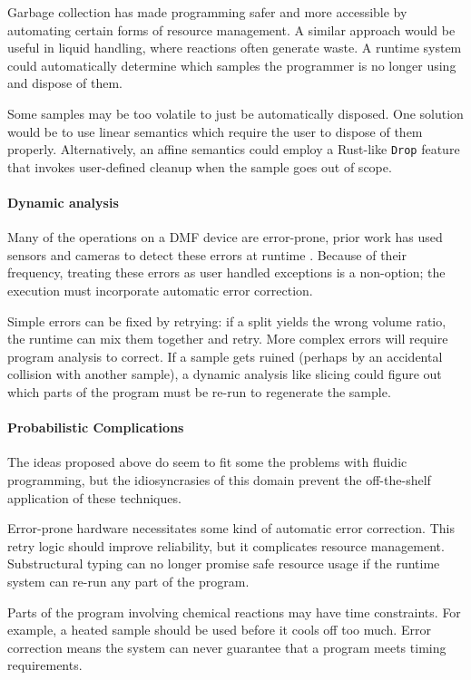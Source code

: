 \documentclass[
  10pt,
  a4paper,
  twocolumn,
]{article}
\begin{document}
Garbage collection has made programming safer and more accessible by automating certain forms of resource management.
A similar approach would be useful in liquid handling, where reactions often generate waste.
A runtime system could automatically determine which samples the programmer is no longer using and dispose of them.

Some samples may be too volatile to just be automatically disposed.
One solution would be to use linear semantics which require the user to dispose of them properly.
Alternatively, an affine semantics could employ a Rust-like {\tt Drop} feature that invokes user-defined cleanup when the sample goes out of scope.

\paragraph{Dynamic analysis}

Many of the operations on a DMF device are error-prone, prior work has used sensors and cameras
to detect these errors at runtime \cite{dmf-vision}. Because of their frequency, treating these errors as
user handled exceptions is a non-option; the execution must incorporate automatic error correction.

Simple errors can be fixed by retrying: if a split yields the wrong volume ratio, the runtime can mix them together and retry.
More complex errors will require program analysis to correct. If a sample gets ruined (perhaps by an accidental collision with
another sample), a dynamic analysis like slicing could figure out which parts of the program must be re-run to regenerate the sample.

\paragraph{Probabilistic Complications}

The ideas proposed above do seem to fit some the problems with fluidic programming, but the idiosyncrasies of this domain prevent the off-the-shelf application of these techniques.

Error-prone hardware necessitates some kind of automatic error correction.
This retry logic should improve reliability, but it complicates resource management.
Substructural typing can no longer promise safe resource usage if the runtime system can re-run any part of the program.

Parts of the program involving chemical reactions may have time constraints.
For example, a heated sample should be used before it cools off too much.
Error correction means the system can never guarantee that a program meets timing requirements.
\end{document}
